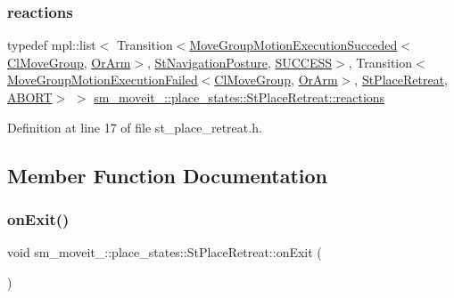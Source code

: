 \subsubsection{\texorpdfstring{reactions}{reactions}}
{\footnotesize\ttfamily typedef mpl\+::list$<$ Transition$<$\hyperlink{structmoveit__z__client_1_1MoveGroupMotionExecutionSucceded}{Move\+Group\+Motion\+Execution\+Succeded}$<$\hyperlink{classmoveit__z__client_1_1ClMoveGroup}{Cl\+Move\+Group}, \hyperlink{classsm__moveit__4_1_1OrArm}{Or\+Arm}$>$, \hyperlink{structsm__moveit__4_1_1place__states_1_1StNavigationPosture}{St\+Navigation\+Posture}, \hyperlink{classSUCCESS}{S\+U\+C\+C\+E\+SS}$>$, Transition$<$\hyperlink{structmoveit__z__client_1_1MoveGroupMotionExecutionFailed}{Move\+Group\+Motion\+Execution\+Failed}$<$\hyperlink{classmoveit__z__client_1_1ClMoveGroup}{Cl\+Move\+Group}, \hyperlink{classsm__moveit__4_1_1OrArm}{Or\+Arm}$>$, \hyperlink{structsm__moveit__4_1_1place__states_1_1StPlaceRetreat}{St\+Place\+Retreat}, \hyperlink{classABORT}{A\+B\+O\+RT}$>$ $>$ \hyperlink{structsm__moveit__4_1_1place__states_1_1StPlaceRetreat_a137af34354b6135e95217e02aefcc456}{sm\+\_\+moveit\+\_\+::place\+\_\+states\+::\+St\+Place\+Retreat\+::reactions}}



Definition at line 17 of file st\+\_\+place\+\_\+retreat.\+h.



\subsection{Member Function Documentation}
\mbox{\label{structsm__moveit__4_1_1place__states_1_1StPlaceRetreat_a700f6a70e4c9836fef4b4b3e9546500d}} 
\subsubsection{\texorpdfstring{on\+Exit()}{onExit()}}
{\footnotesize\ttfamily void sm\+\_\+moveit\+\_\+::place\+\_\+states\+::\+St\+Place\+Retreat\+::on\+Exit (\begin{DoxyParamCaption}{ }\end{DoxyParamCaption})\hspace{0.3cm}{\ttfamily [inline]}}



